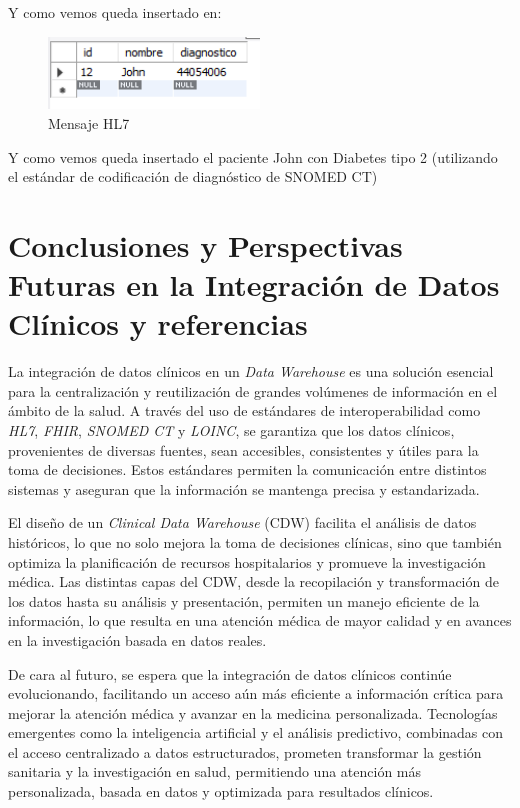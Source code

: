 \documentclass[12pt, a4paper, twoside]{article}
\begin{document}
	Y como vemos queda insertado en: 
	
	\begin{figure}[h!]
		\centering
		\includegraphics[width=0.5\textwidth]{image/10.png}
		\caption{Mensaje HL7}
		\label{fig:10}
	\end{figure}
	\vspace{2cm}
	
	Y como vemos queda insertado el paciente John con Diabetes tipo 2 (utilizando el estándar de codificación de diagnóstico de SNOMED CT)
	
		\section{Conclusiones y Perspectivas Futuras en la Integración de Datos Clínicos y referencias}
	
	La integración de datos clínicos en un \textit{Data Warehouse} es una solución esencial para la centralización y reutilización de grandes volúmenes de información en el ámbito de la salud. A través del uso de estándares de interoperabilidad como \textit{HL7}, \textit{FHIR}, \textit{SNOMED CT} y \textit{LOINC}, se garantiza que los datos clínicos, provenientes de diversas fuentes, sean accesibles, consistentes y útiles para la toma de decisiones. Estos estándares permiten la comunicación entre distintos sistemas y aseguran que la información se mantenga precisa y estandarizada.
	
	El diseño de un \textit{Clinical Data Warehouse} (CDW) facilita el análisis de datos históricos, lo que no solo mejora la toma de decisiones clínicas, sino que también optimiza la planificación de recursos hospitalarios y promueve la investigación médica. Las distintas capas del CDW, desde la recopilación y transformación de los datos hasta su análisis y presentación, permiten un manejo eficiente de la información, lo que resulta en una atención médica de mayor calidad y en avances en la investigación basada en datos reales.
	
	De cara al futuro, se espera que la integración de datos clínicos continúe evolucionando, facilitando un acceso aún más eficiente a información crítica para mejorar la atención médica y avanzar en la medicina personalizada. Tecnologías emergentes como la inteligencia artificial y el análisis predictivo, combinadas con el acceso centralizado a datos estructurados, prometen transformar la gestión sanitaria y la investigación en salud, permitiendo una atención más personalizada, basada en datos y optimizada para resultados clínicos.
	
	\printbibliography
	
	
	
	
\end{document}
